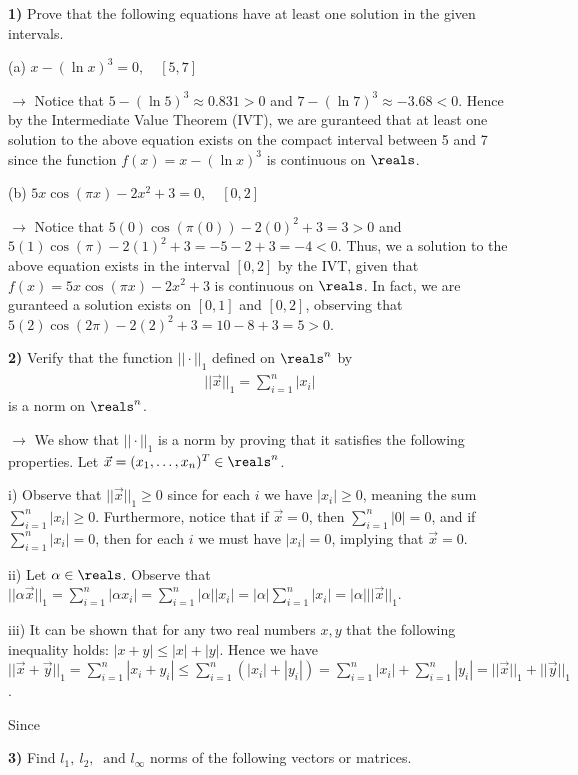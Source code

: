 \documentclass[12pt,a4paper]{article}
\newcommand{\prob}[2]{\textbf{#1)} #2}
\begin{document}
\prob{1}{Prove that the following equations have at least one solution in the given intervals.}

(a) $x - (\ln{x})^3 = 0,\quad [5,7]$

$\rightarrow$ Notice that $5 - (\ln{5})^3 \approx 0.831 > 0$ and $7 - (\ln{7})^3 \approx -3.68 < 0$. Hence by the Intermediate Value Theorem (IVT), we are guranteed that at least one solution to the above equation exists on the compact interval between 5 and 7 since the function $f(x) = x - (\ln{x})^3$ is continuous on $\reals$.

(b) $5x\cos(\pi x) - 2x^2 + 3 = 0,\quad [0,2]$

$\rightarrow$ Notice that $5(0)\cos(\pi (0)) - 2(0)^2 + 3 = 3 > 0$ and $5(1)\cos(\pi) - 2(1)^2 + 3 = -5 - 2 + 3 = -4 < 0$. Thus, we a solution to the above equation exists in the interval $[0,2]$ by the IVT, given that $f(x) = 5x\cos(\pi x) - 2x^2 + 3$ is continuous on $\reals$. In fact, we are guranteed a solution exists on $[0,1]$ and $[0,2]$, observing that $5(2)\cos(2\pi) - 2(2)^2 + 3 = 10 - 8 + 3 = 5 > 0$.  

\prob{2}{Verify that the function $|| \cdot ||_1$ defined on $\reals^n$ by
\begin{align*}
||\vec{x}||_1 = \sum_{i=1}^{n} |x_i|
\end{align*}
is a norm on $\reals^n$.}

$\rightarrow$ We show that $||\cdot||_1$ is a norm by proving that it satisfies the following properties. Let $\vec{x} = (x_1,\hdots, x_n)^{T} \in \reals^n$.

i) Observe that $||\vec{x}||_1 \geq 0$ since for each $i$ we have $|x_i| \geq 0$, meaning the sum $\sum_{i=1}^{n} |x_i| \geq 0$. Furthermore, notice that if $\vec{x} = 0$, then $\sum_{i=1}^{n} |0| = 0$, and if $\sum_{i=1}^{n} |x_i| = 0$, then for each $i$ we must have $|x_i| = 0$, implying that $\vec{x} = 0$.

ii) Let $\alpha \in \reals$. Observe that $||\alpha\vec{x}||_1 = \sum_{i=1}^{n} |\alpha x_i| = \sum_{i=1}^{n} |\alpha||x_i| = |\alpha|\sum_{i=1}^{n} |x_i|= |\alpha|||\vec{x}||_1$.

iii) It can be shown that for any two real numbers $x,y$ that the following inequality holds: $|x+y| \leq |x| + |y|$. Hence we have $||\vec{x} + \vec{y}||_1 = \sum_{i=1}^{n} |x_i + y_i| \leq \sum_{i=1}^{n} (|x_i| + |y_i|) = \sum_{i=1}^{n} |x_i| + \sum_{i=1}^{n} |y_i| = ||\vec{x}||_1 + ||\vec{y}||_1$.

Since 

\prob{3}{Find $l_1,~l_2,~\text{ and }l_{\infty}$ norms of the following vectors or matrices.}
\end{document}
